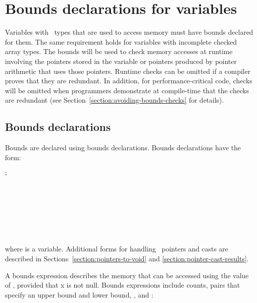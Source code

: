 
\chapter{Bounds declarations for variables}
\label{chapter:tracking-bounds}

Variables with \arrayptr\ types that are used to access
memory must have bounds declared for them.  The same requirement
holds for variables with incomplete checked array types.
The bounds will be used to check
memory accesses at runtime involving the pointers stored in the variable
or pointers produced by pointer arithmetic that uses those pointers.
Runtime checks can be omitted if a compiler proves that they are
redundant. In addition, for performance-critical code, checks will be
omitted when programmers demonstrate at compile-time that the checks are
redundant (see Section~\ref{section:avoiding-bounds-checks} for details).

\section{Bounds declarations}
\label{section:bounds-declarations}

Bounds are declared using bounds declarations. Bounds declarations have
the form:

\begin{tabbing}
\=- \\
\>  \\
\\
 \\
\>  \\
\>  \\
\> \boundsunknown \\
\> \boundsany
\end{tabbing}

where  is a variable. Additional forms for handling
\void\ pointers and casts are described in
Sections~\ref{section:pointers-to-void} and \ref{section:pointer-cast-results}.

A bounds expression describes the memory that can be accessed using the
value of , provided that x is not null. Bounds expressions
include counts, pairs that specify an upper bound and lower bound,
\boundsunknown, and \boundsany:

